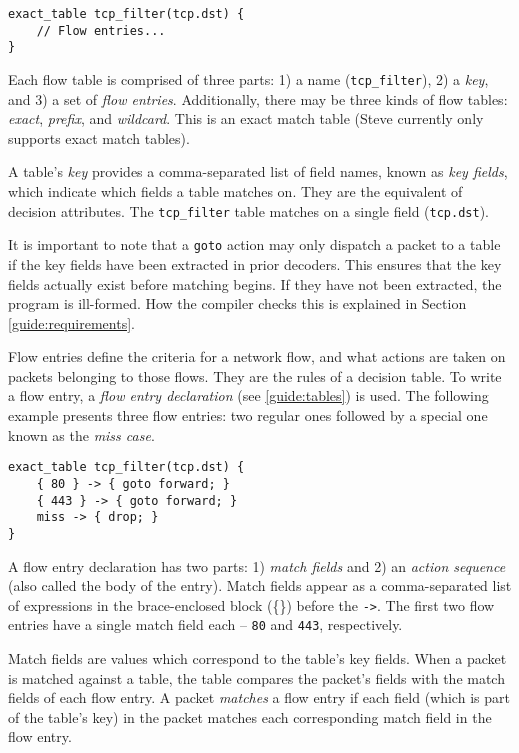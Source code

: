 \begin{lstlisting}
exact_table tcp_filter(tcp.dst) {
	// Flow entries...
}
\end{lstlisting}

Each flow table is comprised of three parts: 
1) a name (\texttt{tcp\_filter}), 
2) a \textit{key}, and
3) a set of \textit{flow entries}. 
Additionally, there may be three kinds of flow tables: 
\textit{exact}, \textit{prefix}, and \textit{wildcard}. 
This is an exact match table (Steve currently only supports exact
match tables).

A table's \textit{key} provides a comma-separated list of field names, known as
\textit{key fields}, which indicate which fields a table matches on.
They are the equivalent of decision attributes. 
The \texttt{tcp\_filter} table matches on a single field (\texttt{tcp.dst}).

It is important to note that a \texttt{goto} action may only dispatch
a packet to a table if the key fields have been extracted in prior decoders. This ensures that the key fields actually exist before matching begins. If they have not been extracted, the program is ill-formed. How the compiler checks this is explained in Section \ref{guide:requirements}.

Flow entries define the criteria for a network flow, and
what actions are taken on packets belonging to those flows.
They are the rules of a decision table.
To write a flow entry, a \textit{flow entry declaration}
(see \ref{guide:tables}) is used.
The following example presents three flow entries:
two regular ones followed by a special one known as the \emph{miss case}.

\begin{lstlisting}
exact_table tcp_filter(tcp.dst) {
	{ 80 } -> { goto forward; }
	{ 443 } -> { goto forward; }
	miss -> { drop; }
}
\end{lstlisting}

A flow entry declaration has two parts: 1) \textit{match
fields} and 2) an \textit{action sequence} (also called the body of the entry). 
Match fields appear as a comma-separated list of expressions 
in the brace-enclosed block (\{\}) before the \texttt{->}. 
The first two flow entries have a single match field each --
\texttt{80} and \texttt{443}, respectively.

Match fields are values which correspond to the table's key fields. 
When a packet is matched against a table,
the table compares the packet's fields with the match fields of each flow entry.
A packet \textit{matches} a flow entry if each field (which is part of the
table's key) in the packet matches each corresponding match field in the flow 
entry. 

